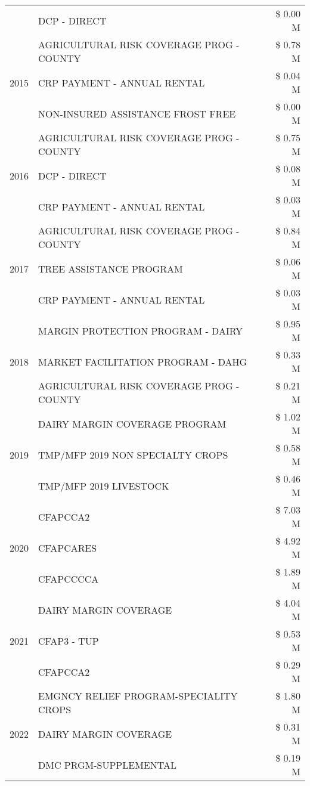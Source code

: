\begin{tabular}{llr}
 & DCP - DIRECT & \$ 0.00 M \\
\cline{1-3}
\multirow[t]{3}{*}{2015} & AGRICULTURAL RISK COVERAGE PROG - COUNTY & \$ 0.78 M \\
 & CRP PAYMENT - ANNUAL RENTAL & \$ 0.04 M \\
 & NON-INSURED ASSISTANCE FROST FREE & \$ 0.00 M \\
\cline{1-3}
\multirow[t]{3}{*}{2016} & AGRICULTURAL RISK COVERAGE PROG - COUNTY & \$ 0.75 M \\
 & DCP - DIRECT & \$ 0.08 M \\
 & CRP PAYMENT - ANNUAL RENTAL & \$ 0.03 M \\
\cline{1-3}
\multirow[t]{3}{*}{2017} & AGRICULTURAL RISK COVERAGE PROG - COUNTY & \$ 0.84 M \\
 & TREE ASSISTANCE PROGRAM & \$ 0.06 M \\
 & CRP PAYMENT - ANNUAL RENTAL & \$ 0.03 M \\
\cline{1-3}
\multirow[t]{3}{*}{2018} & MARGIN PROTECTION PROGRAM - DAIRY & \$ 0.95 M \\
 & MARKET FACILITATION PROGRAM - DAHG & \$ 0.33 M \\
 & AGRICULTURAL RISK COVERAGE PROG - COUNTY & \$ 0.21 M \\
\cline{1-3}
\multirow[t]{3}{*}{2019} & DAIRY MARGIN COVERAGE PROGRAM & \$ 1.02 M \\
 & TMP/MFP 2019 NON SPECIALTY CROPS & \$ 0.58 M \\
 & TMP/MFP 2019 LIVESTOCK & \$ 0.46 M \\
\cline{1-3}
\multirow[t]{3}{*}{2020} & CFAPCCA2 & \$ 7.03 M \\
 & CFAPCARES & \$ 4.92 M \\
 & CFAPCCCCA & \$ 1.89 M \\
\cline{1-3}
\multirow[t]{3}{*}{2021} & DAIRY MARGIN COVERAGE & \$ 4.04 M \\
 & CFAP3 - TUP & \$ 0.53 M \\
 & CFAPCCA2 & \$ 0.29 M \\
\cline{1-3}
\multirow[t]{3}{*}{2022} & EMGNCY RELIEF PROGRAM-SPECIALITY CROPS & \$ 1.80 M \\
 & DAIRY MARGIN COVERAGE & \$ 0.31 M \\
 & DMC PRGM-SUPPLEMENTAL & \$ 0.19 M \\
\cline{1-3}
\bottomrule
\end{tabular}
